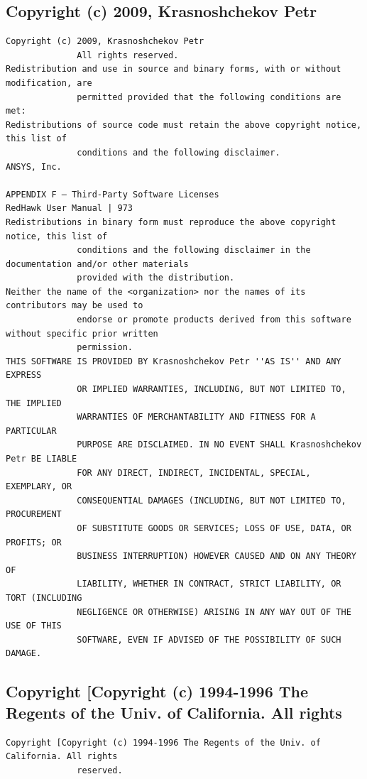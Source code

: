 \subsection{Copyright (c) 2009, Krasnoshchekov Petr}

\begin{lstlisting}[basicstyle=\ttfamily\scriptsize,breaklines=true]
Copyright (c) 2009, Krasnoshchekov Petr
              All rights reserved.
Redistribution and use in source and binary forms, with or without modification, are
              permitted provided that the following conditions are met:
Redistributions of source code must retain the above copyright notice, this list of
              conditions and the following disclaimer.
ANSYS, Inc.

APPENDIX F — Third-Party Software Licenses                                   RedHawk User Manual | 973
Redistributions in binary form must reproduce the above copyright notice, this list of
              conditions and the following disclaimer in the documentation and/or other materials
              provided with the distribution.
Neither the name of the <organization> nor the names of its contributors may be used to
              endorse or promote products derived from this software without specific prior written
              permission.
THIS SOFTWARE IS PROVIDED BY Krasnoshchekov Petr ''AS IS'' AND ANY EXPRESS
              OR IMPLIED WARRANTIES, INCLUDING, BUT NOT LIMITED TO, THE IMPLIED
              WARRANTIES OF MERCHANTABILITY AND FITNESS FOR A PARTICULAR
              PURPOSE ARE DISCLAIMED. IN NO EVENT SHALL Krasnoshchekov Petr BE LIABLE
              FOR ANY DIRECT, INDIRECT, INCIDENTAL, SPECIAL, EXEMPLARY, OR
              CONSEQUENTIAL DAMAGES (INCLUDING, BUT NOT LIMITED TO, PROCUREMENT
              OF SUBSTITUTE GOODS OR SERVICES; LOSS OF USE, DATA, OR PROFITS; OR
              BUSINESS INTERRUPTION) HOWEVER CAUSED AND ON ANY THEORY OF
              LIABILITY, WHETHER IN CONTRACT, STRICT LIABILITY, OR TORT (INCLUDING
              NEGLIGENCE OR OTHERWISE) ARISING IN ANY WAY OUT OF THE USE OF THIS
              SOFTWARE, EVEN IF ADVISED OF THE POSSIBILITY OF SUCH DAMAGE.
\end{lstlisting}

\subsection{Copyright [Copyright (c) 1994-1996 The Regents of the Univ. of California. All rights}

\begin{lstlisting}[basicstyle=\ttfamily\scriptsize,breaklines=true]
Copyright [Copyright (c) 1994-1996 The Regents of the Univ. of California. All rights
              reserved.
\end{lstlisting}

